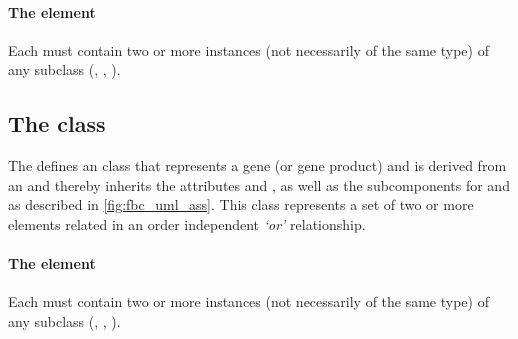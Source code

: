 \paragraph{The  element}
Each \GeneAnd must contain two or more instances (not necessarily of
the same type) of any \Association subclass (\GeneAnd, \GeneOr,
\GeneProductRef).


\subsection{The \FBC {} class}
\label{or-class}

The \FBCPackage defines an \GeneOr class that represents a gene
(or gene product) and is derived from an \Association and thereby inherits
the \SBase attributes  and , as well as the
subcomponents for \Annotation and \Notes as described in \ref{fig:fbc_uml_ass}.
This class represents a set of two or more \Association elements related
in an order independent \emph{`or'} relationship.

\paragraph{The  element}
Each \GeneOr must contain two or more instances (not necessarily of the
same type) of any \Association subclass (\GeneAnd, \GeneOr, \GeneProductRef).
%

